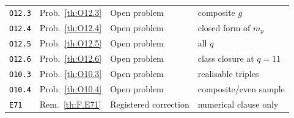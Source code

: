 \begin{longtable}{@{}p{14mm}p{17mm}p{27mm}p{58mm}@{}}
\texttt{O12.3} & Prob.~\ref{th:O12.3} & Open problem & composite $g$ \\
\texttt{O12.4} & Prob.~\ref{th:O12.4} & Open problem & closed form of $m_p$ \\
\texttt{O12.5} & Prob.~\ref{th:O12.5} & Open problem & all $q$ \\
\texttt{O12.6} & Prob.~\ref{th:O12.6} & Open problem & class closure at $q=11$ \\
\texttt{O10.3} & Prob.~\ref{th:O10.3} & Open problem & realisable triples \\
\texttt{O10.4} & Prob.~\ref{th:O10.4} & Open problem & composite/even sample \\
\texttt{E71} & Rem.~\ref{th:F.E71} & Registered correction & numerical clause only \\
\bottomrule
\end{longtable}
\normalsize
